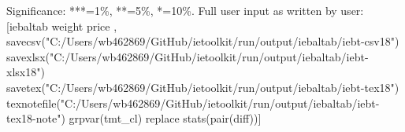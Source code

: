Significance: ***=1\%, **=5\%, *=10\%. Full user input as written by user: [iebaltab weight price , savecsv("C:/Users/wb462869/GitHub/ietoolkit/run/output/iebaltab/iebt-csv18") savexlsx("C:/Users/wb462869/GitHub/ietoolkit/run/output/iebaltab/iebt-xlsx18") savetex("C:/Users/wb462869/GitHub/ietoolkit/run/output/iebaltab/iebt-tex18") texnotefile("C:/Users/wb462869/GitHub/ietoolkit/run/output/iebaltab/iebt-tex18-note") grpvar(tmt\_cl) replace stats(pair(diff))]

